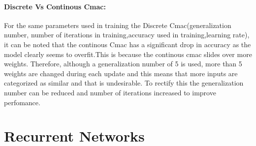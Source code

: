 \documentclass{article}
\begin{document}
  \paragraph{Discrete Vs Continous Cmac:}
  For the same parameters used in training the Discrete Cmac(generalization number, number of iterations in training,accuracy used in training,learning rate), it can be noted that the continous Cmac has a significant drop in accuracy as the model clearly seems to overfit.This is because the continous cmac slides over more weights. Therefore, although a generalization number of 5 is used, more than 5 weights are changed during each update and this means that more inputs are categorized as similar and that is undesirable. To rectify this the generalization number can be reduced and number of iterations increased to improve perfomance.   
\newpage
\section{Recurrent Networks}
\end{document}
